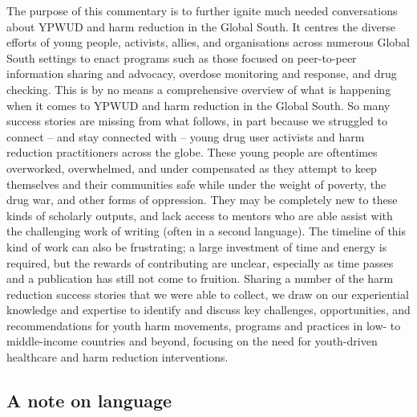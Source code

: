 \documentclass[
  letterpaper,
  DIV=11,
  numbers=noendperiod]{scrartcl}
\begin{document}
The purpose of this commentary is to further ignite much needed
conversations about YPWUD and harm reduction in the Global South. It
centres the diverse efforts of young people, activists, allies, and
organisations across numerous Global South settings to enact programs
such as those focused on peer-to-peer information sharing and advocacy,
overdose monitoring and response, and drug checking. This is by no means
a comprehensive overview of what is happening when it comes to YPWUD and
harm reduction in the Global South. So many success stories are missing
from what follows, in part because we struggled to connect -- and stay
connected with -- young drug user activists and harm reduction
practitioners across the globe. These young people are oftentimes
overworked, overwhelmed, and under compensated as they attempt to keep
themselves and their communities safe while under the weight of poverty,
the drug war, and other forms of oppression. They may be completely new
to these kinds of scholarly outputs, and lack access to mentors who are
able assist with the challenging work of writing (often in a second
language). The timeline of this kind of work can also be frustrating; a
large investment of time and energy is required, but the rewards of
contributing are unclear, especially as time passes and a publication
has still not come to fruition. Sharing a number of the harm reduction
success stories that we were able to collect, we draw on our
experiential knowledge and expertise to identify and discuss key
challenges, opportunities, and recommendations for youth harm movements,
programs and practices in low- to middle-income countries and beyond,
focusing on the need for youth-driven healthcare and harm reduction
interventions.

\subsection{A note on language}\label{sec-language}
\end{document}
